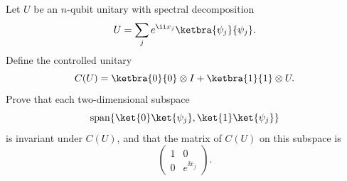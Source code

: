 Let $U$ be an $n$-qubit unitary with spectral decomposition
$$
    U=\sum_j e^{\ii x_j}\ketbra{\psi_j}{\psi_j}.
$$
Define the controlled unitary
$$
    C(U)=\ketbra{0}{0}\otimes I+\ketbra{1}{1}\otimes U.
$$
Prove that each two-dimensional subspace
$$
    \operatorname{span}\{\ket{0}\ket{\psi_j},\ket{1}\ket{\psi_j}\}
$$
is invariant under $C(U)$, and that the matrix of $C(U)$ on this subspace is
$$
    \begin{pmatrix}1&0\\0&e^{\ii x_j}\end{pmatrix}.
$$
